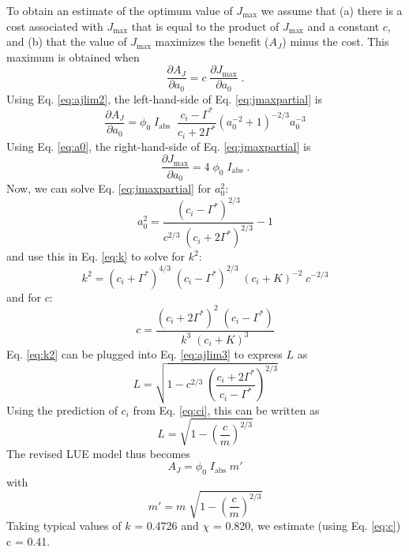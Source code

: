 \documentclass{myreport}
\begin{document}
To obtain an estimate of the optimum value of $J_{\mathrm{max}}$ we assume that (a) there is a cost associated with $J_{\mathrm{max}}$ that is equal to the product of $J_{\mathrm{max}}$ and a constant $c$, and (b) that the value of $J_{\mathrm{max}}$ maximizes the benefit ($A_J$) minus the cost. 
This maximum is obtained when
\begin{equation}
\label{eq:jmaxpartial}
    \frac{\partial A_J}{\partial a_0} = c \; \frac{\partial J_{\mathrm{max}}}{\partial a_0}\;.
\end{equation}
Using Eq. \ref{eq:ajlim2}, the left-hand-side of Eq. \ref{eq:jmaxpartial} is 
\begin{equation}
    \frac{\partial A_J}{\partial a_0} = \phi_0 \; I_{\mathrm{abs}} \; \; \frac{c_i - \Gamma^{\ast}}{c_i + 2\Gamma^{\ast}} \left( a_0^{-2} + 1 \right) ^{-2/3} a_0^{-3}
\end{equation}
Using Eq. \ref{eq:a0}, the right-hand-side of Eq. \ref{eq:jmaxpartial} is 
\begin{equation}
    \frac{\partial J_{\mathrm{max}}}{\partial a_0} = 4 \; \phi_0 \; I_{\mathrm{abs}}\;.
\end{equation}
Now, we can solve Eq. \ref{eq:jmaxpartial} for $a_0^2$:
\begin{equation}
\label{eq:a0}
a_0^2 = \frac{(c_i - \Gamma^{\ast})^{2/3}}{c^{2/3} \; (c_i+2\Gamma^{\ast})^{2/3}}-1
\end{equation}
and use this in Eq. \ref{eq:k} to solve for $k^2$:
\begin{equation}
\label{eq:k2}
k^2 = (c_i+ \Gamma^{\ast})^{4/3} \; (c_i - \Gamma^{\ast})^{2/3} \; (c_i + K)^{-2} \; c^{-2/3}
\end{equation}
and for $c$:
\begin{equation}
\label{eq:c}
    c = \frac{(c_i+2\Gamma^{\ast})^2\;(c_i-\Gamma^{\ast})}{k^3\;(c_i+K)^3}
\end{equation}
Eq. \ref{eq:k2} can be plugged into Eq. \ref{eq:ajlim3} to express $L$ as
\begin{equation}
    L = \sqrt{1-c^{2/3} \; \left( \frac{c_i+2\Gamma^{\ast}}{c_i-\Gamma^{\ast}}\right)^{2/3}  }
\end{equation}
Using the prediction of $c_i$ from Eq. \ref{eq:ci}, this can be written as
\begin{equation}
    L =  \sqrt{1 - \left( \frac{c}{m} \right)^{2/3} }
\end{equation}
The revised LUE model thus becomes
\begin{equation}
\label{eq:ajlim4}
    A_J = \phi_0 \; I_{\mathrm{abs}} \; m'
\end{equation}
with
\begin{equation}
    m' = m \; \sqrt{1 - \left( \frac{c}{m} \right)^{2/3} }
\end{equation}
Taking typical values of $k$ = 0.4726 and $\chi$ = 0.820, we estimate (using Eq. \ref{eq:c}) c = 0.41.
\end{document}
